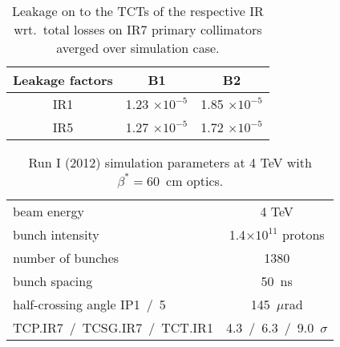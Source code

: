 \begin{table}%
   \centering
   \caption{Leakage on to the TCTs of the respective IR wrt.~total losses on IR7 primary collimators averged over simulation case.}

   \begin{tabular}{c|c|c}
       \hline
       Leakage factors & B1 & B2\\
       \hline
       \hline
       IR1 & 1.23 $\times 10^{-5}$ & 1.85 $\times 10^{-5}$  \\
       IR5 & 1.27 $\times 10^{-5}$ & 1.72 $\times 10^{-5}$  \\
       \hline
   \end{tabular}
   \label{leakageFactors4TeV}
\end{table}


\begin{table}
   \centering
   \caption{Run I (2012) simulation parameters at 4 TeV with $\beta^* = 60$~cm optics.}
   \begin{tabular}{l|c}
       \hline
       beam energy & 4 TeV \\
       bunch intensity & 1.4$\times 10^{11}$ protons\\
       number of bunches & 1380 \\
       bunch spacing & 50~ns \\
       half-crossing angle IP1~/~5 & 145~$\mu$rad \\
       TCP.IR7~/~TCSG.IR7~/~TCT.IR1 & 4.3~/~6.3~/~9.0~$\sigma$ \\
       \hline
   \end{tabular}
   \label{paramsRun1}
\end{table}

